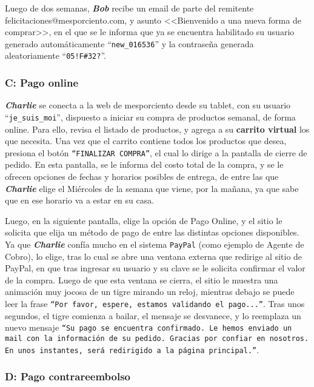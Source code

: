 Luego de dos semanas, \textbf{\emph{Bob}} recibe un email de parte del
remitente felicitaciones@mesporciento.com, y asunto <<Bienvenido a una nueva
forma de comprar>>, en el que se le informa que ya se encuentra habilitado su
usuario generado automáticamente ``\texttt{new\_016536}'' y la contraseña
generada aleatoriamente ``\texttt{05!F\#32?}''.

\subsubsection{C: Pago online}

\textbf{\emph{Charlie}} se conecta a la web de mesporciento desde su tablet,
con su usuario ``\texttt{je\_suis\_moi}'', dispuesto a iniciar su compra de
productos semanal, de forma online. Para ello, revisa el listado de productos,
y agrega a su \textbf{carrito virtual} los que necesita. Una vez que el
carrito contiene todos los productos que desea, presiona el botón
\texttt{``FINALIZAR COMPRA''}, el cual lo dirige a la pantalla de cierre de
pedido. En esta pantalla, se le informa del costo total de la compra, y se le
ofrecen opciones de fechas y horarios posibles de entrega, de entre las que
\textbf{\emph{Charlie}} elige el Miércoles de la semana que viene, por la
mañana, ya que sabe que en ese horario va a estar en su casa.

Luego, en la siguiente pantalla, elige la opción de Pago Online, y el sitio le
solicita que elija un método de pago de entre las distintas opciones
disponibles. Ya que \textbf{\emph{Charlie}} confía mucho en el sistema
\texttt{PayPal} (como ejemplo de Agente de Cobro), lo elige, tras lo cual se
abre una ventana externa que redirige al sitio de PayPal, en que tras ingresar
su usuario y su clave se le solicita confirmar el valor de la compra. Luego de
que esta ventana se cierra, el sitio le muestra una animación muy jocosa de un
tigre mirando un reloj, mientras debajo se puede leer la frase \texttt{``Por
favor, espere, estamos validando el pago...''}. Tras unos segundos, el tigre
comienza a bailar, el mensaje se desvanece, y lo reemplaza un nuevo mensaje
\texttt{``Su pago se encuentra confirmado. Le hemos enviado un mail con la
información de su pedido. Gracias por confiar en nosotros. En unos instantes,
será redirigido a la página principal.''}.

\subsubsection{D: Pago contrareembolso}

